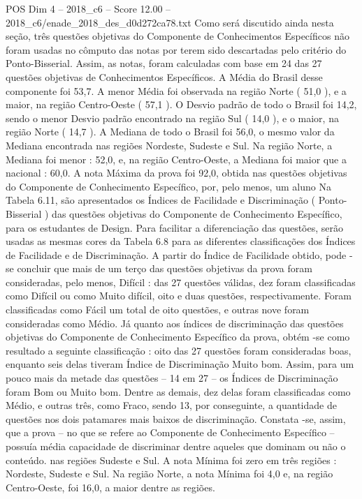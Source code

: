 \begin{textsample}{POS Dim 4 – 2018\_c6 – Score 12.00 – 2018\_c6/enade\_2018\_des\_d0d272ca78.txt}
Como será discutido ainda nesta seção, três questões objetivas do Componente de Conhecimentos Específicos não foram usadas no cômputo das notas por terem sido descartadas pelo critério do Ponto-Bisserial.
Assim, as notas, foram calculadas com base em 24 das 27 questões objetivas de Conhecimentos Específicos.
A Média do Brasil desse componente foi 53,7.
A menor Média foi observada na região Norte ( 51,0 ), e a maior, na região Centro-Oeste ( 57,1 ).
O Desvio padrão de todo o Brasil foi 14,2, sendo o menor Desvio padrão encontrado na região Sul ( 14,0 ), e o maior, na região Norte ( 14,7 ).
A Mediana de todo o Brasil foi 56,0, o mesmo valor da Mediana encontrada nas regiões Nordeste, Sudeste e Sul.
Na região Norte, a Mediana foi menor : 52,0, e, na região Centro-Oeste, a Mediana foi maior que a nacional : 60,0.
A nota Máxima da prova foi 92,0, obtida nas questões objetivas do Componente de Conhecimento Específico, por, pelo menos, um aluno Na Tabela 6.11, são apresentados os Índices de Facilidade e Discriminação ( Ponto-Bisserial ) das questões objetivas do Componente de Conhecimento Específico, para os estudantes de Design.
Para facilitar a diferenciação das questões, serão usadas as mesmas cores da Tabela 6.8 para as diferentes classificações dos Índices de Facilidade e de Discriminação.
A partir do Índice de Facilidade obtido, pode -se concluir que mais de um terço das questões objetivas da prova foram consideradas, pelo menos, Difícil : das 27 questões válidas, dez foram classificadas como Difícil ou como Muito difícil, oito e duas questões, respectivamente.
Foram classificadas como Fácil um total de oito questões, e outras nove foram consideradas como Médio.
Já quanto aos índices de discriminação das questões objetivas do Componente de Conhecimento Específico da prova, obtém -se como resultado a seguinte classificação : oito das 27 questões foram consideradas boas, enquanto seis delas tiveram Índice de Discriminação Muito bom.
Assim, para um pouco mais da metade das questões – 14 em 27 – os Índices de Discriminação foram Bom ou Muito bom.
Dentre as demais, dez delas foram classificadas como Médio, e outras três, como Fraco, sendo 13, por conseguinte, a quantidade de questões nos dois patamares mais baixos de discriminação.
Constata -se, assim, que a prova – no que se refere ao Componente de Conhecimento Específico – possuía média capacidade de discriminar dentre aqueles que dominam ou não o conteúdo. nas regiões Sudeste e Sul.
A nota Mínima foi zero em três regiões : Nordeste, Sudeste e Sul.
Na região Norte, a nota Mínima foi 4,0 e, na região Centro-Oeste, foi 16,0, a maior dentre as regiões.

\end{textsample}

